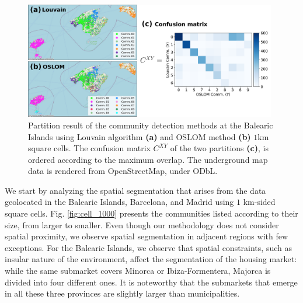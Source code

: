 \begin{figure}
    \label{fig:agreement_method}
    \centering
    \includegraphics[width = 0.98\textwidth]{Figs/Idealista_segmentation/agreement_method.pdf}
	\caption[Agreement between different partitions.]{ Partition result of the community detection methods at the Balearic Islands using Louvain algorithm \textbf{(a)} and OSLOM method \textbf{(b)} $1 \textrm{km}$ square cells. The confusion matrix $C^{XY}$ of the two partitions \textbf{(c)}, is ordered according to the maximum overlap. The underground map data is rendered from OpenStreetMap, under ODbL.}
\end{figure}

We start by analyzing the spatial segmentation that arises from the data geolocated in the Balearic Islands, Barcelona, and Madrid using $1$ km-sided square cells. Fig. \ref{fig:cell_1000} presents the communities listed according to their size, from larger to smaller. Even though our methodology does not consider spatial proximity, we observe spatial segmentation in adjacent regions with few exceptions. For the Balearic Islands, we observe that spatial constraints, such as insular nature of the environment, affect the segmentation of the housing market: while the same submarket covers Minorca or Ibiza-Formentera, Majorca is divided into four different ones. It is noteworthy that the submarkets that emerge in all these three provinces are slightly larger than municipalities.

